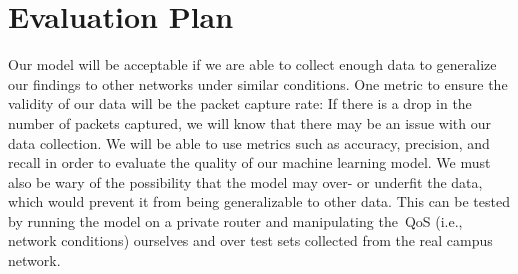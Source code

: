 \section{Evaluation Plan}\label{evaluation}
    Our model will be acceptable if we are able to collect enough data to generalize our findings to other networks under similar conditions. One metric to ensure the validity of our data will be the packet capture rate: If there is a drop in the number of packets captured, we will know that there may be an issue with our data collection. We will be able to use metrics such as accuracy, precision, and recall in order to evaluate the quality of our machine learning model. We must also be wary of the possibility that the model may over- or underfit the data, which would prevent it from being generalizable to other data. This can be tested by running the model on a private router and manipulating the~QoS (i.e., network conditions) ourselves and over test sets collected from the real campus network.

